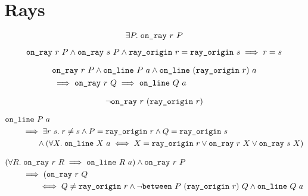 \section{Rays}
\begin{equation*}
  \exists P.\; \texttt{on\_ray}\ r\ P
\end{equation*}

\begin{equation*}
    \texttt{on\_ray}\ r\ P \wedge \texttt{on\_ray}\ s\ P\wedge\texttt{ray\_origin}\ r = \texttt{ray\_origin}\ s\implies r = s
\end{equation*}

\begin{equation*}
  \begin{split}
    &\texttt{on\_ray}\ r\ P \wedge \texttt{on\_line}\ P\ a \wedge \texttt{on\_line}\ (\texttt{ray\_origin}\ r)\ a\\
    &\implies \texttt{on\_ray}\ r\ Q \implies \texttt{on\_line}\ Q\ a
  \end{split}
\end{equation*}

\begin{equation*}
\neg\texttt{on\_ray}\ r\ (\texttt{ray\_origin}\ r)
\end{equation*}

\begin{equation*}
  \begin{split}
    &\texttt{on\_line}\ P\ a\\
    &\qquad\implies \exists r\ s.\; r \neq s\wedge P = \texttt{ray\_origin}\ r \wedge Q = \texttt{ray\_origin}\ s\\
    &\qquad\qquad \wedge (\forall X.\; \texttt{on\_line}\ X\ a \iff X = \texttt{ray\_origin}\ r \vee \texttt{on\_ray}\ r\ X \vee \texttt{on\_ray}\ s\ X)
    \end{split}
\end{equation*}

\begin{equation*}
  \begin{split}
    &(\forall R.\; \texttt{on\_ray}\ r\ R \implies \texttt{on\_line}\ R\ a) \wedge \texttt{on\_ray}\ r\ P\\
    &\qquad\implies (\texttt{on\_ray}\ r\ Q\\
    &\qquad\qquad\iff Q \neq \texttt{ray\_origin}\ r \wedge \neg\texttt{between}\ P\ (\texttt{ray\_origin}\ r)\ Q \wedge \texttt{on\_line}\ Q\ a
  \end{split}
\end{equation*}
